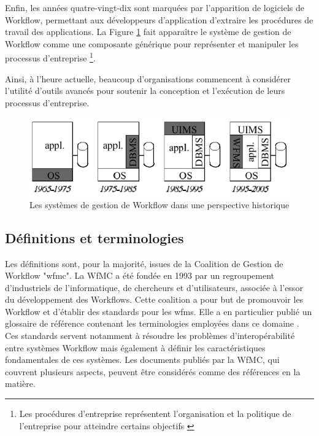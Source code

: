  	   Enfin, les années quatre-vingt-dix sont marquées par l’apparition de logiciels de Workflow, permettant aux développeurs d’application d’extraire les procédures de travail des applications. La Figure \ref{fig:wfmchistory} fait apparaître le système de gestion de Workflow comme une composante générique pour représenter et manipuler les processus d’entreprise \footnote[1]{\samepage Les procédures d’entreprise représentent l’organisation et la politique de l’entreprise pour atteindre certains objectifs \parencite{WFMC11} }. 
 	  
 	  Ainsi, à l’heure actuelle, beaucoup d’organisations commencent à considérer l’utilité d’outils avancés pour soutenir la conception et l’exécution de leurs processus d’entreprise.
 	 
 	 
 	 
\begin{figure}[h]
	\centering
	\includegraphics[width=0.7\linewidth]{images/wfmcHistory}
	\caption{Les systèmes de gestion de Workflow dans une perspective historique }
	\label{fig:wfmchistory}
\end{figure}
 	 
 	 
 	 \subsection{Définitions et terminologies }
 	 
 	 Les définitions sont, pour la majorité, issues de la Coalition de Gestion de Workflow "\ac{wfmc}". La WfMC a été fondée en 1993 par un regroupement d’industriels de l’informatique, de chercheurs et d’utilisateurs, associée à l’essor du développement des Workflows. Cette coalition a pour but de promouvoir les Workflow et d’établir des standards pour les \ac{wfms}. Elle a en particulier publié un glossaire de référence contenant les terminologies employées dans ce domaine \parencite{WFMC11}. Ces standards servent notamment à résoudre les problèmes d’interopérabilité entre systèmes Workflow mais également à définir les caractéristiques fondamentales de ces systèmes. Les documents publiés par la WfMC, qui couvrent plusieurs aspects, peuvent être considérés comme des références en la matière. 
 	
